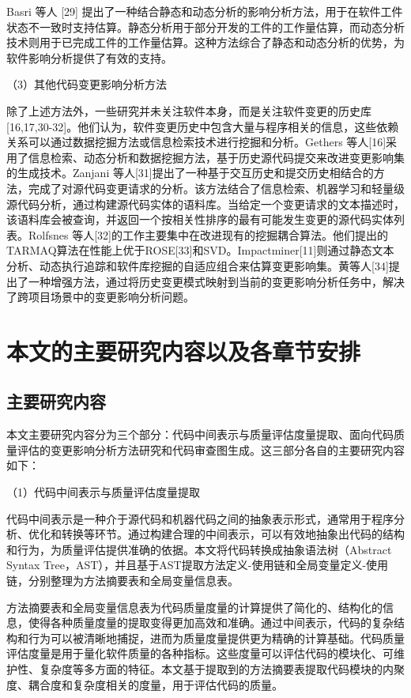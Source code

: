 Basri 等人 [29] 提出了一种结合静态和动态分析的影响分析方法，用于在软件工件状态不一致时支持估算。静态分析用于部分开发的工件的工作量估算，而动态分析技术则用于已完成工件的工作量估算。这种方法综合了静态和动态分析的优势，为软件影响分析提供了有效的支持。 

（3）其他代码变更影响分析方法

除了上述方法外，一些研究并未关注软件本身，而是关注软件变更的历史库[16,17,30-32]。他们认为，软件变更历史中包含大量与程序相关的信息，这些依赖关系可以通过数据挖掘方法或信息检索技术进行挖掘和分析。Gethers 等人[16]采用了信息检索、动态分析和数据挖掘方法，基于历史源代码提交来改进变更影响集的生成技术。Zanjani 等人[31]提出了一种基于交互历史和提交历史相结合的方法，完成了对源代码变更请求的分析。该方法结合了信息检索、机器学习和轻量级源代码分析，通过构建源代码实体的语料库。当给定一个变更请求的文本描述时，该语料库会被查询，并返回一个按相关性排序的最有可能发生变更的源代码实体列表。Rolfsnes 等人[32]的工作主要集中在改进现有的挖掘耦合算法。他们提出的TARMAQ算法在性能上优于ROSE[33]和SVD。Impactminer[11]则通过静态文本分析、动态执行追踪和软件库挖掘的自适应组合来估算变更影响集。黄等人[34]提出了一种增强方法，通过将历史变更模式映射到当前的变更影响分析任务中，解决了跨项目场景中的变更影响分析问题。




\section{本文的主要研究内容以及各章节安排}
\subsection{主要研究内容}
本文主要研究内容分为三个部分：代码中间表示与质量评估度量提取、面向代码质量评估的变更影响分析方法研究和代码审查图生成。这三部分各自的主要研究内容如下：

（1）代码中间表示与质量评估度量提取

代码中间表示是一种介于源代码和机器代码之间的抽象表示形式，通常用于程序分析、优化和转换等环节。通过构建合理的中间表示，可以有效地抽象出代码的结构和行为，为质量评估提供准确的依据。本文将代码转换成抽象语法树（Abstract Syntax Tree，AST），并且基于AST提取方法定义-使用链和全局变量定义-使用链，分别整理为方法摘要表和全局变量信息表。

方法摘要表和全局变量信息表为代码质量度量的计算提供了简化的、结构化的信息，使得各种质量度量的提取变得更加高效和准确。通过中间表示，代码的复杂结构和行为可以被清晰地捕捉，进而为质量度量提供更为精确的计算基础。代码质量评估度量是用于量化软件质量的各种指标。这些度量可以评估代码的模块化、可维护性、复杂度等多方面的特征。本文基于提取到的方法摘要表提取代码模块的内聚度、耦合度和复杂度相关的度量，用于评估代码的质量。

